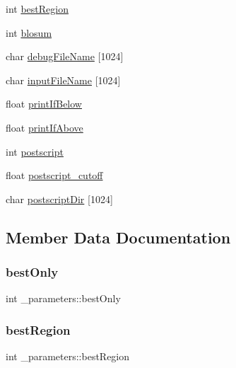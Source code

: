 \begin{DoxyCompactItemize}
int \hyperlink{struct__parameters_ad8bdd1fcbd46e8fb6842e5ab77b9c8fe}{best\+Region}
\item 
int \hyperlink{struct__parameters_a3857ab2091fd5bbda92463952163163f}{blosum}
\item 
char \hyperlink{struct__parameters_a82681df81d7bc113bc6fad0b5328a95d}{debug\+File\+Name} \mbox{[}1024\mbox{]}
\item 
char \hyperlink{struct__parameters_a1b9b47e6f58186d767de1d34d956b516}{input\+File\+Name} \mbox{[}1024\mbox{]}
\item 
float \hyperlink{struct__parameters_ad73fc37c8e5f6964149f12899200472b}{print\+If\+Below}
\item 
float \hyperlink{struct__parameters_aa9034282619631f32acd19230990ea6e}{print\+If\+Above}
\item 
int \hyperlink{struct__parameters_a7080180324a5b3081e85eb308d2d530c}{postscript}
\item 
float \hyperlink{struct__parameters_a796cc87fce657443f51845fd1098f0df}{postscript\+\_\+cutoff}
\item 
char \hyperlink{struct__parameters_a6c33be73b16d623ca8e5af964d248424}{postscript\+Dir} \mbox{[}1024\mbox{]}
\end{DoxyCompactItemize}


\subsection{Member Data Documentation}
\mbox{\label{struct__parameters_acdebd1fac8029bad117f9ba82bef93d5}} 
\subsubsection{\texorpdfstring{best\+Only}{bestOnly}}
{\footnotesize\ttfamily int \+\_\+parameters\+::best\+Only}

\mbox{\label{struct__parameters_ad8bdd1fcbd46e8fb6842e5ab77b9c8fe}} 
\subsubsection{\texorpdfstring{best\+Region}{bestRegion}}
{\footnotesize\ttfamily int \+\_\+parameters\+::best\+Region}

